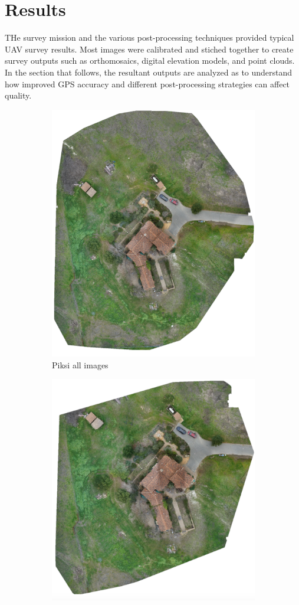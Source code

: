 \documentclass{article}
\begin{document}
\section{Results}
THe survey mission and the various post-processing techniques provided typical UAV survey results.  Most images were calibrated and stiched together to create survey outputs such as orthomosaics, digital elevation models, and point clouds.  In the section that follows, the resultant outputs are analyzed as to understand how improved GPS accuracy and different post-processing strategies can affect quality.
\begin{figure}
\centering
\renewcommand*\thesubfigure{\arabic{subfigure}}
\begin{subfigure}{.33\textwidth}
  \centering
  \includegraphics[width=.75\linewidth]{images/orthomosaics/p.png}
  \caption{Piksi all images}
  \label{fig:sub1}
\end{subfigure}%
\begin{subfigure}{.33\textwidth}
  \centering
  \includegraphics[width=.75\linewidth]{images/orthomosaics/p_every_other_line.png}

\end{subfigure}
\end{figure}
\end{document}
